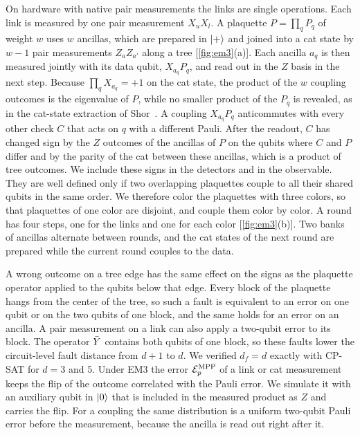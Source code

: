 On hardware with native pair measurements the links are single operations. Each link is measured by one pair measurement $X_uX_l$. A plaquette $P=\prod_q P_q$ of weight $w$ uses $w$ ancillas, which are prepared in $\left|+\right\rangle$ and joined into a cat state by $w-1$ pair measurements $Z_aZ_{a'}$ along a tree [\autoref{fig:em3}(a)]. Each ancilla $a_q$ is then measured jointly with its data qubit, $X_{a_q}P_q$, and read out in the $Z$ basis in the next step. Because $\prod_qX_{a_q}=+1$ on the cat state, the product of the $w$ coupling outcomes is the eigenvalue of $P$, while no smaller product of the $P_q$ is revealed, as in the cat-state extraction of Shor~\cite{shor1996}. A coupling $X_{a_q}P_q$ anticommutes with every other check $C$ that acts on $q$ with a different Pauli. After the readout, $C$ has changed sign by the $Z$ outcomes of the ancillas of $P$ on the qubits where $C$ and $P$ differ and by the parity of the cat between these ancillas, which is a product of tree outcomes. We include these signs in the detectors and in the observable. They are well defined only if two overlapping plaquettes couple to all their shared qubits in the same order. We therefore color the plaquettes with three colors, so that plaquettes of one color are disjoint, and couple them color by color. A round has four steps, one for the links and one for each color [\autoref{fig:em3}(b)]. Two banks of ancillas alternate between rounds, and the cat states of the next round are prepared while the current round couples to the data.

A wrong outcome on a tree edge has the same effect on the signs as the plaquette operator applied to the qubits below that edge. Every block of the plaquette hangs from the center of the tree, so such a fault is equivalent to an error on one qubit or on the two qubits of one block, and the same holds for an error on an ancilla. A pair measurement on a link can also apply a two-qubit error to its block. The operator $\bar{Y}$ contains both qubits of one block, so these faults lower the circuit-level fault distance from $d+1$ to $d$. We verified $d_f=d$ exactly with CP-SAT for $d=3$ and $5$. Under EM3 the error $\mathcal{E}^{\rm MPP}_p$ of a link or cat measurement keeps the flip of the outcome correlated with the Pauli error. We simulate it with an auxiliary qubit in $\left|0\right\rangle$ that is included in the measured product as $Z$ and carries the flip. For a coupling the same distribution is a uniform two-qubit Pauli error before the measurement, because the ancilla is read out right after it.

